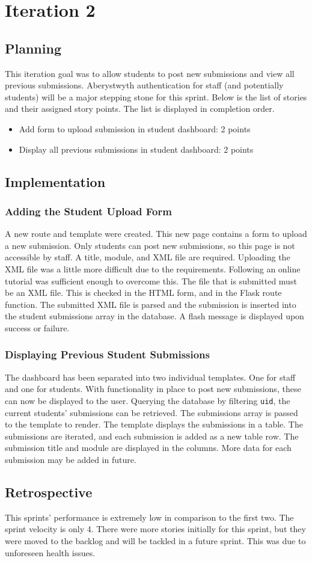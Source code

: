 \chapter{Iteration 2}
\section{Planning}
This iteration goal was to allow students to post new submissions and view all previous submissions. Aberystwyth authentication for staff (and potentially students) will be a major stepping stone for this sprint. Below is the list of stories and their assigned story points. The list is displayed in completion order.

\begin{itemize}
\item Add form to upload submission in student dashboard: 2 points
\item Display all previous submissions in student dashboard: 2 points
\end{itemize}

\section{Implementation}
\subsection{Adding the Student Upload Form}
A new route and template were created. This new page contains a form to upload a new submission. Only students can post new submissions, so this page is not accessible by staff. A title, module, and XML file are required. Uploading the XML file was a little more difficult due to the requirements. Following an online tutorial was sufficient enough to overcome this\cite{FlaskUploadingFiles}. The file that is submitted must be an XML file. This is checked in the HTML form, and in the Flask route function. The submitted XML file is parsed and the submission is inserted into the student submissions array in the database. A flash message is displayed upon success or failure.

\subsection{Displaying Previous Student Submissions}
The dashboard has been separated into two individual templates. One for staff and one for students. With functionality in place to post new submissions, these can now be displayed to the user. Querying the database by filtering \texttt{uid}, the current students' submissions can be retrieved. The submissions array is passed to the template to render. The template displays the submissions in a table. The submissions are iterated, and each submission is added as a new table row. The submission title and module are displayed in the columns. More data for each submission may be added in future.

\section{Retrospective}
This sprints' performance is extremely low in comparison to the first two. The sprint velocity is only 4. There were more stories initially for this sprint, but they were moved to the backlog and will be tackled in a future sprint. This was due to unforeseen health issues.
